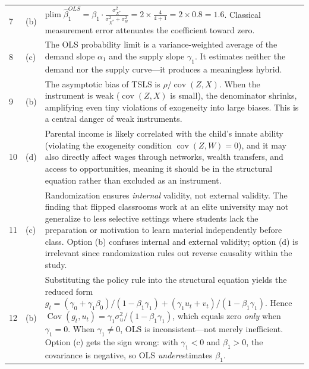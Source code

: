 \documentclass[11pt]{article}
\begin{document}
\begin{longtable}{p{}p{}p{}}
7 & (b) & $\text{plim}\;\widehat{\beta}_1^{OLS} = \beta_1 \cdot \frac{\sigma_{X^*}^2}{\sigma_{X^*}^2 + \sigma_w^2} = 2 \times \frac{4}{4+1} = 2 \times 0.8 = 1.6$. Classical measurement error attenuates the coefficient toward zero. \\

8 & (c) & The OLS probability limit is a variance-weighted average of the demand slope $\alpha_1$ and the supply slope $\gamma_1$. It estimates neither the demand nor the supply curve---it produces a meaningless hybrid. \\

9 & (b) & The asymptotic bias of TSLS is $\rho / \operatorname{cov}(Z,X)$. When the instrument is weak ($\operatorname{cov}(Z,X)$ is small), the denominator shrinks, amplifying even tiny violations of exogeneity into large biases. This is a central danger of weak instruments. \\

10 & (d) & Parental income is likely correlated with the child's innate ability (violating the exogeneity condition $\operatorname{cov}(Z, W) = 0$), and it may also directly affect wages through networks, wealth transfers, and access to opportunities, meaning it should be in the structural equation rather than excluded as an instrument. \\

11 & (c) & Randomization ensures \emph{internal} validity, not external validity. The finding that flipped classrooms work at an elite university may not generalize to less selective settings where students lack the preparation or motivation to learn material independently before class. Option (b) confuses internal and external validity; option (d) is irrelevant since randomization rules out reverse causality within the study.  \\

12 & (b) & Substituting the policy rule into the structural equation yields the reduced form $g_t = (\gamma_0 + \gamma_1 \beta_0)/(1 - \beta_1 \gamma_1) + (\gamma_1 u_t + v_t)/(1 - \beta_1 \gamma_1)$. Hence $\operatorname{Cov}(g_t, u_t) = \gamma_1 \sigma_u^2 / (1 - \beta_1 \gamma_1)$, which equals zero \emph{only} when $\gamma_1 = 0$. When $\gamma_1 \neq 0$, OLS is inconsistent---not merely inefficient. Option (c) gets the sign wrong: with $\gamma_1 < 0$ and $\beta_1 > 0$, the covariance is negative, so OLS \emph{under}estimates $\beta_1$.  \\
\end{longtable}
\end{document}
